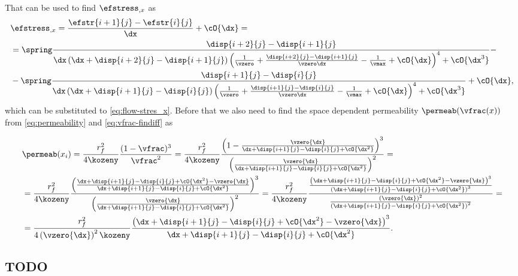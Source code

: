 \documentclass[twoside,a4paper,12pt,draft]{article}
\begin{document}
That can be used to find $\efstress_{,x}$ as
%
\begin{align}
  &\efstress_{,x} = \frac{\efstr{i+1}{j} - \efstr{i}{j}}{\dx} + \cO{\dx}= \nonumber \\
  &=
  \spring
   \frac{\disp{i+2}{j} - \disp{i+1}{j}}{{\dx}\left(\dx + \disp{i+2}{j} - \disp{i+1}{j}\right){\left(\frac{1}{\vzero} + \frac{\disp{i+2}{j} - \disp{i+1}{j}}{\vzero\dx} -\frac{1}{\vmax}  + \cO{\dx}\right)^4} + \cO{\dx^3}}- \nonumber\\ 
  &-\spring
  \frac{\disp{i+1}{j} - \disp{i}{j}}{{\dx}\left(\dx + \disp{i+1}{j} - \disp{i}{j}\right){\left(\frac{1}{\vzero} + \frac{\disp{i+1}{j} - \disp{i}{j}}{\vzero\dx} -\frac{1}{\vmax}  + \cO{\dx}\right)^4} + \cO{\dx^3}}%
   + \cO{\dx},
\end{align}
%
which can be substituted to \eqref{eq:flow-stres_x}. Before that we
also need to find the space dependent permeability
$\permeab(\vfrac(x))$ from \eqref{eq:permeability}  and \eqref{eq:vfrac-findiff} as

\begin{align}
  &\permeab(x_i) = \frac{r_f^2}{4\kozeny} \frac{(1-\vfrac)^3}{\vfrac^2}=
    \frac{r_f^2}{4\kozeny} \frac{\left(1-\frac{\vzero{\dx}}{{\dx + \disp{i+1}{j} - \disp{i}{j} + \cO{\dx^2}}}\right)^3}{\left(\frac{\vzero{\dx}}{{\dx + \disp{i+1}{j} - \disp{i}{j} + \cO{\dx^2}}}\right)^2}=\nonumber \\
  &=\frac{r_f^2}{4\kozeny} \frac{\left(\frac{{\dx + \disp{i+1}{j} - \disp{i}{j} + \cO{\dx^2}}-\vzero{\dx}}{{\dx + \disp{i+1}{j} - \disp{i}{j} + \cO{\dx^2}}}\right)^3}{\left(\frac{\vzero{\dx}}{{\dx + \disp{i+1}{j} - \disp{i}{j} + \cO{\dx^2}}}\right)^2}
    =\frac{r_f^2}{4\kozeny} \frac{\frac{\left({\dx + \disp{i+1}{j} - \disp{i}{j} + \cO{\dx^2}}-\vzero{\dx}\right)^3}{\left({\dx + \disp{i+1}{j} - \disp{i}{j} + \cO{\dx^2}}\right)^3}}{\frac{\left(\vzero{\dx}\right)^2}{\left({\dx + \disp{i+1}{j} - \disp{i}{j} + \cO{\dx^2}}\right)^2}}=\nonumber \\
  &  =\frac{r_f^2}{4\left(\vzero{\dx}\right)^2\kozeny} {\frac{\left({\dx + \disp{i+1}{j} - \disp{i}{j} + \cO{\dx^2}}-\vzero{\dx}\right)^3}{{\dx + \disp{i+1}{j} - \disp{i}{j} + \cO{\dx^2}}}}.
\end{align}



\subsection{TODO}
\end{document}
